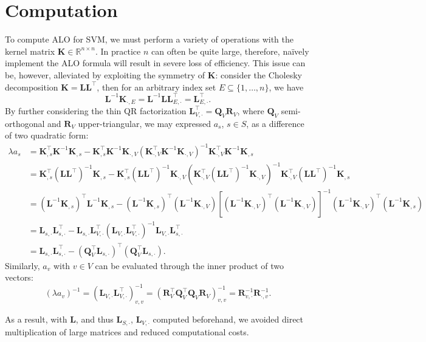 \documentclass[11pt]{article}
\newcommand{\bK}{\bm{K}}
\newcommand{\bL}{\bm{L}}
\newcommand{\bQ}{\bm{Q}}
\newcommand{\bR}{\bm{R}}
\newcommand{\bbr}{\mathbb{R}}
\begin{document}
\section{Computation}
To compute ALO for SVM, we must perform a variety of operations with the kernel matrix \(\bK\in\bbr^{n\times n}\). In practice \(n\) can often be quite large, therefore, na\"{i}vely implement the ALO formula will result in severe loss of efficiency. This issue can be, however, alleviated by exploiting the symmetry of \(\bK\): consider the Cholesky decomposition \(\bK=\bL\bL^\top\), then for an arbitrary index set \(E\subseteq\{1,\dotsc,n\}\), we have \[\bL^{-1}\bK_{\cdot,E}=\bL^{-1}\bL\bL^{\top}_{E,\cdot}=\bL^{\top}_{E,\cdot}.\] By further considering the thin QR factorization \(\bL^{\top}_{V,\cdot}=\bQ_V\bR_V\), where \(\bQ_V\) semi-orthogonal and \(\bR_V\) upper-triangular, we may expressed \(a_s\), \(s\in S\), as a difference of two quadratic form:
	\begin{align*}
	\lambda a_s&=\bK_{, s}^\top\bK^{-1}\bK_{, s}-\bK_{, s}^\top\bK^{-1}\bK_{\cdot,V}\left(\bK_{\cdot,V}^\top\bK^{-1}\bK_{\cdot,V}\right)^{-1}\bK_{\cdot,V}^\top\bK^{-1}\bK_{, s}\\
	&=\bK_{, s}^\top(\bL\bL^\top)^{-1}\bK_{, s}-\bK_{, s}^\top(\bL\bL^\top)^{-1}\bK_{\cdot,V}\left(\bK_{\cdot,V}^\top(\bL\bL^\top)^{-1}\bK_{\cdot,V}\right)^{-1}\bK^\top_{\cdot,V}(\bL\bL^\top)^{-1}\bK_{, s}\\
	&=(\bL^{-1}\bK_{, s})^\top\bL^{-1}\bK_{, s}-(\bL^{-1}\bK_{, s})^\top(\bL^{-1}\bK_{\cdot,V})\left[(\bL^{-1}\bK_{\cdot,V})^\top(\bL^{-1}\bK_{\cdot,V})\right]^{-1}(\bL^{-1}\bK_{\cdot,V})^\top(\bL^{-1}\bK_{, s})\\
	&=\bL_{s,\cdot}\bL^{\top}_{s,\cdot}-\bL_{s,\cdot}\bL^{\top}_{V,\cdot}\left(\bL_{V,\cdot}\bL^{\top}_{V,\cdot}\right)^{-1}\bL_{V,\cdot}\bL^{\top}_{s,\cdot}\\
	&=\bL_{s,\cdot}\bL^{\top}_{s,\cdot}-(\bQ_V^\top\bL_{s,\cdot})^\top(\bQ_V^\top\bL_{s,\cdot}).
	\end{align*}
Similarly, \(a_v\) with \(v\in V\) can be evaluated through the inner product of two vectors: \[(\lambda a_v)^{-1}=\left(\bL_{V,\cdot}\bL^{\top}_{V,\cdot}\right)^{-1}_{v,v}=\left(\bR_V^\top\bQ_V^\top\bQ_V\bR_V\right)^{-1}_{v,v}=\bR^{-1}_{v,\cdot}\bR^{-1}_{\cdot,v}.\]

As a result, with \(\bL\), and thus \(\bL_{S,\cdot}\), \(\bL_{V,\cdot}\) computed beforehand, we avoided direct multiplication of large matrices and reduced computational costs.
\end{document}
